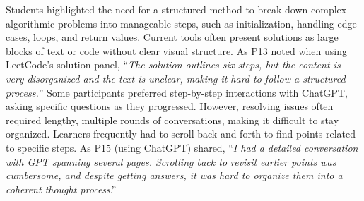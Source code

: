Students highlighted the need for a structured method to break down complex algorithmic problems into manageable steps, such as initialization, handling edge cases, loops, and return values. Current tools often present solutions as large blocks of text or code without clear visual structure. As P13 noted when using LeetCode’s solution panel, ``\emph{The solution outlines six steps, but the content is very disorganized and the text is unclear, making it hard to follow a structured process.}'' Some participants preferred step-by-step interactions with ChatGPT, asking specific questions as they progressed. However, resolving issues often required lengthy, multiple rounds of conversations, making it difficult to stay organized. Learners frequently had to scroll back and forth to find points related to specific steps. As P15 (using ChatGPT) shared, ``\emph{I had a detailed conversation with GPT spanning several pages. Scrolling back to revisit earlier points was cumbersome, and despite getting answers, it was hard to organize them into a coherent thought process}.''








